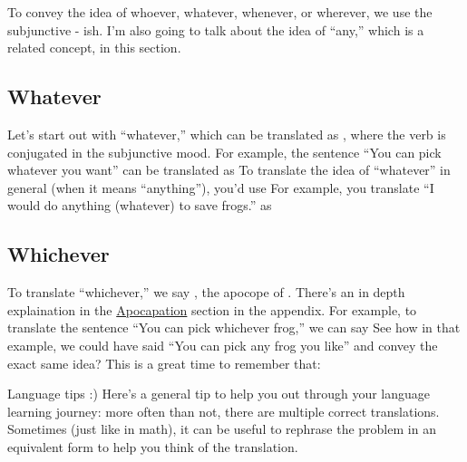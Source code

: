 To convey the idea of whoever, whatever, whenever, or wherever, we use the subjunctive - ish. I'm also going to talk about the idea of ``any,'' which is a related concept, in this section. \\

\subsection{Whatever}
Let's start out with ``whatever,'' which can be translated as , where the verb is conjugated in the subjunctive mood. For example, the sentence ``You can pick whatever you want'' can be translated as  To translate the idea of ``whatever'' in general (when it means ``anything''), you'd use  For example, you translate ``I would do anything (whatever) to save frogs.'' as 

\subsection{Whichever}
\label{subsec:cualquier}
To translate ``whichever,'' we say , the apocope of . There's an in depth explaination in the \hyperref[sec:apo]{Apocapation} section in the appendix. For example, to translate the sentence ``You can pick whichever frog,'' we can say  See how in that example, we could have said ``You can pick any frog you like'' and convey the exact same idea? This is a great time to remember that:

\begin{conf}{Language tips :)}
	Here's a general tip to help you out through your language learning journey: more often than not, there are multiple correct translations. Sometimes (just like in math), it can be useful to rephrase the problem in an equivalent form to help you think of the translation.  
\end{conf}

